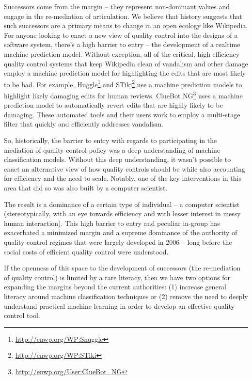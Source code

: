 Successors come from the margin -- they represent non-dominant values and engage in the re-mediation of articulation\cite{mugar2017preserving}.  We believe that history suggests that such successors are a primary means to change in an open ecology like Wikipedia.  For anyone looking to enact a new view of quality control into the designs of a software system, there's a high barrier to entry -- the development of a realtime machine prediction model.  Without exception, all of the critical, high efficiency quality control systems that keep Wikipedia clean of vandalism and other damage employ a machine prediction model for highlighting the edits that are most likely to be bad. For example, Huggle\footnote{\url{http://enwp.org/WP:Snuggle}} and STiki\footnote{\url{http://enwp.org/WP:STiki}} use a machine prediction models to highlight likely damaging edits for human reviews.  ClueBot NG\footnote{\url{http://enwp.org/User:ClueBot_NG}} uses a machine prediction model to automatically revert edits that are highly likely to be damaging.  These automated tools and their users work to employ a multi-stage filter that quickly and efficiently addresses vandalism\cite{geiger2013levee}.

So, historically, the barrier to entry with regards to participating in the mediation of quality control policy was a deep understanding of machine classification models.  Without this deep understanding, it wasn't possible to enact an alternative view of how quality controls should be while also accounting for efficiency and the need to scale.  Notably, one of the key interventions in this area that did so was also built by a computer scientist\cite{halfaker2014snuggle}.

The result is a dominance of a certain type of individual -- a computer scientist (stereotypically, with an eye towards efficiency and with lesser interest in messy human interaction).  This high barrier to entry and peculiar in-group has exacerbated a minimized margin and a supreme dominance of the authority of quality control regimes that were largely developed in 2006 -- long before the social costs of efficient quality control were understood.

If the openness of this space to the development of successors (the re-mediation of quality control) is limited by a rare literacy, then we have two options for expanding the margins beyond the current authorities: (1) increase general literacy around machine classification techniques or (2) remove the need to deeply understand practical machine learning in order to develop an effective quality control tool.

